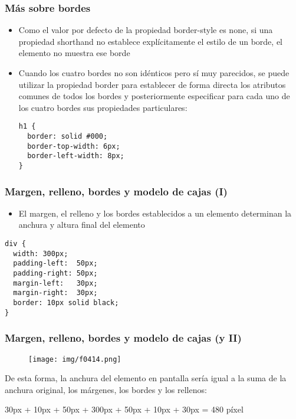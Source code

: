 
\begin{frame}[fragile]
\frametitle{Más sobre bordes}

\begin{itemize}
  \item Como el valor por defecto de la propiedad border-style es none, si una propiedad shorthand no establece explícitamente el estilo de un borde, el elemento no muestra ese borde
  \item Cuando los cuatro bordes no son idénticos pero sí muy parecidos, se puede utilizar la propiedad border para establecer de forma directa los atributos comunes de todos los bordes y posteriormente especificar para cada uno de los cuatro bordes sus propiedades particulares:
\begin{verbatim}
h1 {
  border: solid #000;
  border-top-width: 6px;
  border-left-width: 8px;
}
\end{verbatim}
\end{itemize}

\end{frame}


\begin{frame}[fragile]
\frametitle{Margen, relleno, bordes y modelo de cajas (I)}

\begin{itemize}
  \item El margen, el relleno y los bordes establecidos a un elemento determinan la anchura y altura final del elemento
\end{itemize}

{\footnotesize
\begin{verbatim}
div {
  width: 300px;
  padding-left:  50px;
  padding-right: 50px;
  margin-left:   30px;
  margin-right:  30px;
  border: 10px solid black;
}
\end{verbatim}
}



\end{frame}


\begin{frame}[fragile]
\frametitle{Margen, relleno, bordes y modelo de cajas (y II)}

\begin{center}
\begin{figure}[p]
\texttt{[image: img/f0414.png]}
\end{figure}
\end{center}

De esta forma, la anchura del elemento en pantalla sería igual a la suma de la anchura original, los márgenes, los bordes y los rellenos:

30px + 10px + 50px + 300px + 50px + 10px + 30px = 480 píxel

\end{frame}

